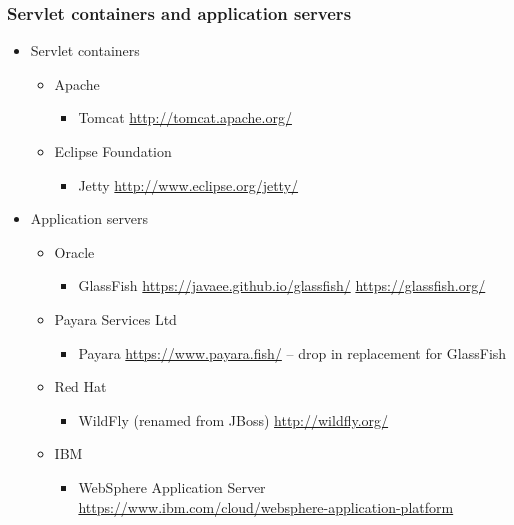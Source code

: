 \documentclass[10pt,xcolor=pdflatex]{beamer}
\begin{document}
\begin{frame}\frametitle{Servlet containers and application servers}
  \begin{itemize}
    \item Servlet containers
      \begin{itemize}
        \item Apache
          \begin{itemize}
            \item Tomcat \url{http://tomcat.apache.org/}
          \end{itemize}
        \item Eclipse Foundation
          \begin{itemize}
            \item Jetty \url{http://www.eclipse.org/jetty/}
          \end{itemize}
      \end{itemize}
 	\item Application servers
  	  \begin{itemize}
        \item Oracle
          \begin{itemize}
            \item GlassFish \url{https://javaee.github.io/glassfish/}
            \url{https://glassfish.org/}
          \end{itemize}
        \item Payara Services Ltd
          \begin{itemize}
            \item Payara \url{https://www.payara.fish/} -- drop in replacement for GlassFish
          \end{itemize}
        \item Red Hat
          \begin{itemize}
            \item WildFly (renamed from JBoss) \url{http://wildfly.org/}
          \end{itemize}
        \item IBM
          \begin{itemize}
            \item WebSphere Application Server \url{https://www.ibm.com/cloud/websphere-application-platform}
          \end{itemize}
      \end{itemize}
  \end{itemize}
\end{frame}
\end{document}
